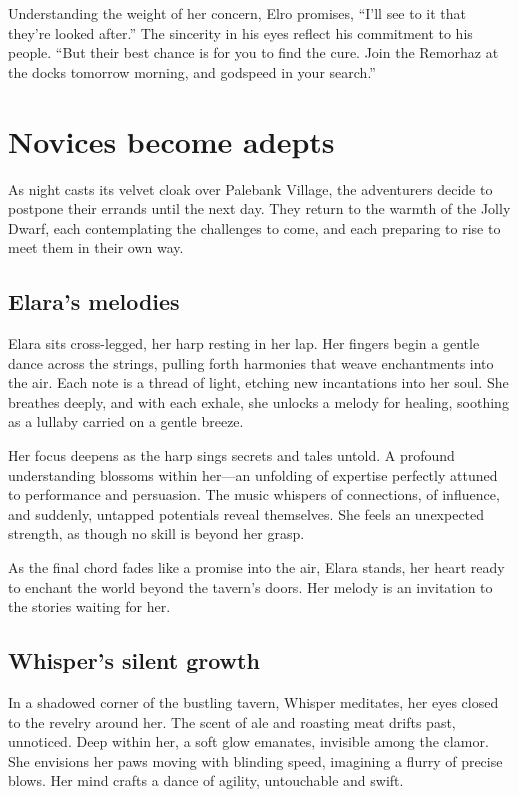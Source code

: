 \documentclass[
  letterpaper,12pt,twoside,twocolumn,openany,
  nodeprecatedcode,bg=full]{dndbook}
\begin{document}
Understanding the weight of her concern, Elro promises, ``I'll see to it
that they're looked after.'' The sincerity in his eyes reflect his
commitment to his people. ``But their best chance is for you to find the
cure. Join the Remorhaz at the docks tomorrow morning, and godspeed in
your search.''

\section{Novices become adepts}\label{novices-become-adepts}

As night casts its velvet cloak over Palebank Village, the adventurers
decide to postpone their errands until the next day. They return to the
warmth of the Jolly Dwarf, each contemplating the challenges to come,
and each preparing to rise to meet them in their own way.

\subsection{Elara's melodies}\label{elaras-melodies}

Elara sits cross-legged, her harp resting in her lap. Her fingers begin
a gentle dance across the strings, pulling forth harmonies that weave
enchantments into the air. Each note is a thread of light, etching new
incantations into her soul. She breathes deeply, and with each exhale,
she unlocks a melody for healing, soothing as a lullaby carried on a
gentle breeze.

Her focus deepens as the harp sings secrets and tales untold. A profound
understanding blossoms within her---an unfolding of expertise perfectly
attuned to performance and persuasion. The music whispers of
connections, of influence, and suddenly, untapped potentials reveal
themselves. She feels an unexpected strength, as though no skill is
beyond her grasp.

As the final chord fades like a promise into the air, Elara stands, her
heart ready to enchant the world beyond the tavern's doors. Her melody
is an invitation to the stories waiting for her.

\subsection{Whisper's silent growth}\label{whispers-silent-growth}

In a shadowed corner of the bustling tavern, Whisper meditates, her eyes
closed to the revelry around her. The scent of ale and roasting meat
drifts past, unnoticed. Deep within her, a soft glow emanates, invisible
among the clamor. She envisions her paws moving with blinding speed,
imagining a flurry of precise blows. Her mind crafts a dance of agility,
untouchable and swift.
\end{document}
